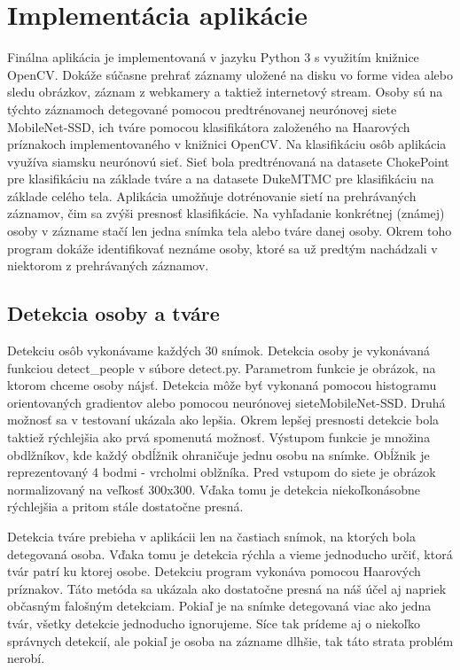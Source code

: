 \chapter{Implementácia aplikácie}
\label{kap:implementacia}
Finálna aplikácia je implementovaná v jazyku Python 3 s využitím knižnice OpenCV. 
Dokáže súčasne prehrať záznamy uložené na disku vo forme videa alebo sledu obrázkov, záznam z webkamery a taktiež internetový stream.
Osoby sú na týchto záznamoch detegované pomocou predtrénovanej neurónovej siete MobileNet-SSD, 
ich tváre pomocou klasifikátora založeného na Haarových príznakoch implementovaného v knižnici OpenCV. 
Na klasifikáciu osôb aplikácia využíva siamsku neurónovú sieť. 
Sieť bola predtrénovaná na datasete ChokePoint pre klasifikáciu na základe tváre a na datasete DukeMTMC pre klasifikáciu na základe celého tela.
Aplikácia umožňuje dotrénovanie sietí na prehrávaných záznamov, čim sa zvýši presnosť klasifikácie.
Na vyhľadanie konkrétnej (známej) osoby v zázname stačí len jedna snímka tela alebo tváre danej osoby. 
Okrem toho program dokáže identifikovať neznáme osoby, ktoré sa už predtým nachádzali v niektorom z prehrávaných záznamov.

\section{Detekcia osoby a tváre}
Detekciu osôb vykonávame každých 30 snímok. 
Detekcia osoby je vykonávaná funkciou detect\_people v súbore detect.py. Parametrom funkcie je obrázok, na ktorom chceme osoby nájsť.
Detekcia môže byť vykonaná pomocou histogramu orientovaných gradientov alebo pomocou neurónovej sieteMobileNet-SSD.
Druhá možnosť sa v testovaní ukázala ako lepšia. 
Okrem lepšej presnosti detekcie bola taktiež rýchlejšia ako prvá spomenutá možnosť.
Výstupom funkcie je množina obdlžníkov, kde každý obdĺžnik ohraničuje jednu osobu na snímke. 
Obĺžnik je reprezentovaný 4 bodmi - vrcholmi oblžníka.
Pred vstupom do siete je obrázok normalizovaný na veľkosť 300x300. 
Vďaka tomu je detekcia niekoľkonásobne rýchlejšia a pritom stále dostatočne presná.

Detekcia tváre prebieha v aplikácii len na častiach snímok, na ktorých bola detegovaná osoba.
Vďaka tomu je detekcia rýchla a vieme jednoducho určiť, ktorá tvár patrí ku ktorej osobe.
Detekciu program vykonáva pomocou Haarových príznakov. 
Táto metóda sa ukázala ako dostatočne presná na náš účel aj napriek občasným falošným detekciam.
Pokiaľ je na snímke detegovaná viac ako jedna tvár, všetky detekcie jednoducho ignorujeme. 
Síce tak prídeme aj o niekoľko správnych detekcií, ale pokiaľ je osoba na zázname dlhšie, tak táto strata problém nerobí.


